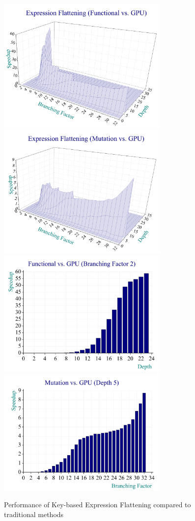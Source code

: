 ﻿\documentclass[numbers,10pt,preprint]{sigplanconf}
\begin{document}
\begin{figure}
\begin{center}
\includegraphics[width=3.3in]{fnc_gpu_3d}
\includegraphics[width=3.3in]{mut_gpu_3d}
\includegraphics[width=3.3in]{fnc_gpu_2d}
\includegraphics[width=3.3in]{mut_gpu_2d}
\end{center}
\caption{Performance of Key-based Expression Flattening compared to traditional methods}
\label{fig-bench}
\end{figure}
\end{document}
